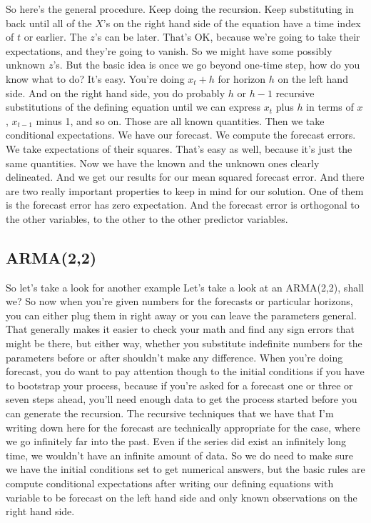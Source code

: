 \documentclass{article}
\begin{document}
So here's the general procedure.
Keep doing the recursion.
Keep substituting in back until all of the $X$'s on the right
hand side of the equation have a time index of $t$ or earlier.
The $z$'s can be later.
That's OK, because we're going to take their expectations,
and they're going to vanish.
So we might have some possibly unknown $z$'s.
But the basic idea is once we go beyond one-time step,
how do you know what to do?
It's easy.
You're doing $x_t+h$ for horizon $h$
on the left hand side.
And on the right hand side, you do probably $h$ or $h-1$
recursive substitutions of the defining equation
until we can express $x_t$ plus $h$ in terms of $x$, $x_{t-1}$
minus 1, and so on.
Those are all known quantities.
Then we take conditional expectations.
We have our forecast.
We compute the forecast errors.
We take expectations of their squares.
That's easy as well, because it's just the same quantities.
Now we have the known and the unknown ones
clearly delineated.
And we get our results for our mean squared forecast error.
And there are two really important properties
to keep in mind for our solution.
One of them is the forecast error has zero expectation.
And the forecast error is orthogonal
to the other variables, to the other  to the other predictor variables.

\subsection*{ARMA(2,2)}

So let's take a look for another example
Let's take a look at an ARMA(2,2), shall we?
So now when you're given numbers for the forecasts
or particular horizons, you can either plug them in right away
or you can leave the parameters general.
That generally makes it easier to check your math
and find any sign errors that might be there,
but either way, whether you substitute indefinite numbers
for the parameters before or after shouldn't
make any difference.
When you're doing forecast, you do want to pay attention though
to the initial conditions if you have to bootstrap your process,
because if you're asked for a forecast one or three
or seven steps ahead, you'll need enough data to get
the process started before you can generate the recursion.
The recursive techniques that we have
that I'm writing down here for the forecast
are technically appropriate for the case, where we go
infinitely far into the past.
Even if the series did exist an infinitely long time,
we wouldn't have an infinite amount of data.
So we do need to make sure we have the initial conditions set
to get numerical answers, but the basic rules are compute
conditional expectations after writing our defining
equations with variable to be forecast on the left hand side
and only known observations on the right hand side.
\end{document}

